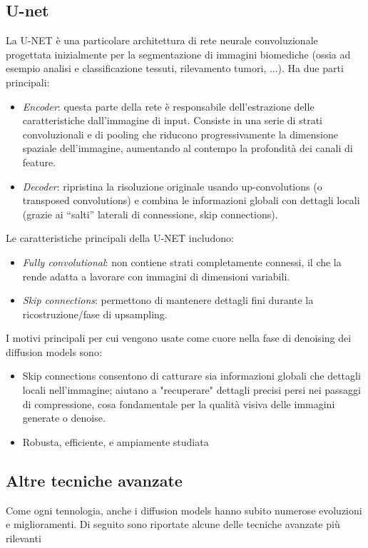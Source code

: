 \subsection{U-net}
La U-NET è una particolare architettura di rete neurale convoluzionale progettata inizialmente per la segmentazione di immagini biomediche (ossia ad esempio analisi e classificazione tessuti, rilevamento tumori, ...). Ha due parti principali:
\begin{itemize}
	\item \textit{Encoder}: questa parte della rete è responsabile dell'estrazione delle caratteristiche dall'immagine di input. Consiste in una serie di strati convoluzionali e di pooling che riducono progressivamente la dimensione spaziale dell'immagine, aumentando al contempo la profondità dei canali di feature.
	\item \textit{Decoder}: ripristina la risoluzione originale usando up-convolutions (o transposed convolutions) e combina le informazioni globali con dettagli locali (grazie ai “salti” laterali di connessione, skip connections).
\end{itemize}
Le caratteristiche principali della U-NET includono:
\begin{itemize}
	\item \textit{Fully convolutional}: non contiene strati completamente connessi, il che la rende adatta a lavorare con immagini di dimensioni variabili.
	\item \textit{Skip connections}: permettono di mantenere dettagli fini durante la ricostruzione/fase di upsampling.
\end{itemize}
I motivi principali per cui vengono usate come cuore nella fase di denoising dei diffusion models sono:
\begin{itemize}
	\item Skip connections consentono di catturare sia informazioni globali che dettagli locali nell'immagine; aiutano a "recuperare" dettagli precisi persi nei passaggi di compressione, cosa fondamentale per la qualità visiva delle immagini generate o denoise.
	\item Robusta, efficiente, e ampiamente studiata
\end{itemize}

\subsection{Altre tecniche avanzate}
Come ogni tennologia, anche i diffusion models hanno subito numerose evoluzioni e miglioramenti. Di seguito sono riportate alcune delle tecniche avanzate più rilevanti

